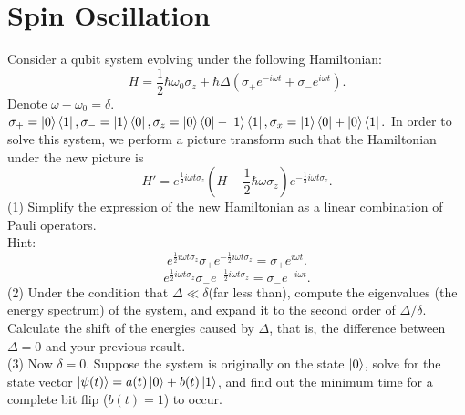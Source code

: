 \documentclass[12pt]{article}
\begin{document}
\section{Spin Oscillation}
Consider a qubit system evolving under the following Hamiltonian:
\[H=\frac{1}{2}\hbar\omega_0\sigma_z+\hbar\Delta(\sigma_+e^{-i\omega t}+\sigma_-e^{i\omega t}).\]
Denote $\omega-\omega_0=\delta.$ $\sigma_+=\ket0\bra1,\sigma_-=\ket1\bra0,\sigma_z=\ket0\bra0-\ket1\bra1,\sigma_x=\ket1\bra0+\ket0\bra1.$ In order to solve this system, we perform a picture transform such that the Hamiltonian under the new picture is
\[H'=e^{\frac{1}{2}i\omega t\sigma_z}(H-\frac{1}{2}\hbar\omega\sigma_z)e^{-\frac{1}{2}i\omega t\sigma_z}.\]
(1) Simplify the expression of the new Hamiltonian as a linear combination of Pauli operators.\\
Hint:
\[e^{\frac{1}{2}i\omega t\sigma_z}\sigma_+e^{-\frac{1}{2}i\omega t\sigma_z}=\sigma_+e^{i\omega t}.\]
\[e^{\frac{1}{2}i\omega t\sigma_z}\sigma_-e^{-\frac{1}{2}i\omega t\sigma_z}=\sigma_-e^{-i\omega t}.\]
(2) Under the condition that $\Delta\ll \delta$(far less than), compute the eigenvalues (the energy spectrum) of the system, and expand it to the second order of $\Delta/\delta$. Calculate the shift of the energies caused by $\Delta$, that is, the difference between $\Delta=0$ and your previous result.\\
(3) Now $\delta=0$. Suppose the system is originally on the state $\ket0$, solve for the state vector $\ket{\psi(t)}=a(t)\ket0+b(t)\ket1$, and find out the minimum time for a complete bit flip ($b(t)=1$) to occur.
\end{document}
